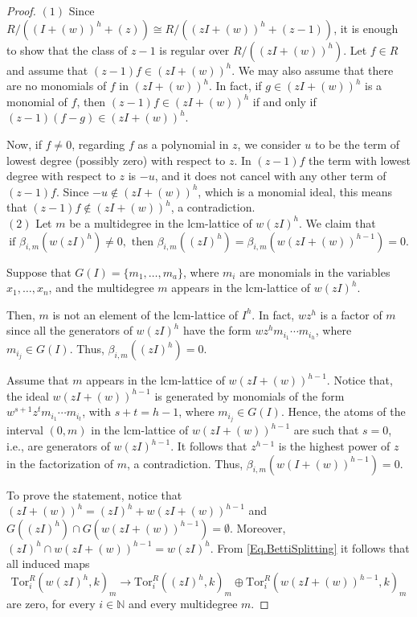 \documentclass[11pt,oneside]{amsart}
\theoremstyle{plain}
\theoremstyle{definition}
\newcommand{\N}{\mathbb{N}}
\begin{document}
\begin{proof}
$\mathrm{(1)}$  Since $R/((I+(w))^h+(z)) \cong R/((zI+(w))^h+(z-1))$, it is enough to show that the class of $z-1$ is regular over $R/((zI+(w))^h)$. Let $f \in R$ and assume that $(z-1)f \in (zI+(w))^h$. We may also assume that there are no monomials of $f$ in $(zI+(w))^h$. In fact, if $g \in (zI+(w))^h$ is a monomial of $f$, then $(z-1)f \in (zI+(w))^h$ if and only if $(z-1)(f-g) \in (zI+(w))^h$. 
    
Now, if $f \neq 0$, regarding $f$ as a polynomial in $z$, we consider $u$ to be the term of lowest degree (possibly zero) with respect to $z$. In $(z-1)f$ the term with lowest degree with respect to $z$ is $-u$, and it does not cancel with any other term of $(z-1)f$. Since $-u \notin (zI+(w))^h$, which is a monomial ideal, this means that $(z-1)f \notin (zI+(w))^h$, a contradiction. \\ 
$\mathrm{(2)}$ Let $m$ be a multidegree in the lcm-lattice of $w(zI)^h$. We claim that 
\begin{equation}\label{Eq.BettiSplitting}
\tag{$\star$}
\text{if } \beta_{i,m}(w(zI)^h) \neq 0, \text{ then }
\beta_{i,m}((zI)^h)=\beta_{i,m}(w(zI +(w))^{h-1})=0.
\end{equation}

Suppose that $G(I) = \{m_1,\dots,m_a\}$, where $m_i$ are monomials in the variables $x_1,\dots,x_n$, and the multidegree $m$ appears in the lcm-lattice of $w(zI)^h$.

Then, $m$ is not an element of the lcm-lattice of $I^h$. In fact, $wz^h$ is a factor of $m$ since all the generators of $w(zI)^h$ have the form $wz^h m_{i_1} \cdots m_{i_h}$, where $m_{i_j} \in G(I)$. Thus, $\beta_{i,m}((zI)^h)=0$. 

Assume that $m$ appears in the lcm-lattice of $w(zI +(w))^{h-1}$. Notice that, the ideal $w(zI +(w))^{h-1}$ is generated by monomials of the form $w^{s+1} z^t m_{i_1} \cdots m_{i_t}$, with $s+t=h-1$, where $m_{i_j} \in G(I)$. Hence, the atoms of the interval $(0,m)$ in the lcm-lattice of $w(zI +(w))^{h-1}$ are such that $s=0$, i.e., are generators of $w(zI)^{h-1}$. It follows that $z^{h-1}$ is the highest power of $z$ in the factorization of $m$, a contradiction. Thus, $\beta_{i,m}(w(I +(w))^{h-1})=0$.

To prove the statement, notice that $(zI +(w))^h=(zI)^h+w(zI +(w))^{h-1}$ and $G((zI)^h) \cap G(w(zI +(w))^{h-1})=\emptyset$. Moreover, $(zI)^h \cap w(zI +(w))^{h-1} = w(zI)^h$. From \eqref{Eq.BettiSplitting} it follows that all induced maps 
\[
\mathrm{Tor}_i^R(w(zI)^h,k)_m \rightarrow \mathrm{Tor}_i^R((zI)^h,k)_m \oplus \mathrm{Tor}_i^R( w(zI +(w))^{h-1},k)_m
\]
are zero, for every $i \in \N$ and every multidegree $m$.
\end{proof}
\end{document}
